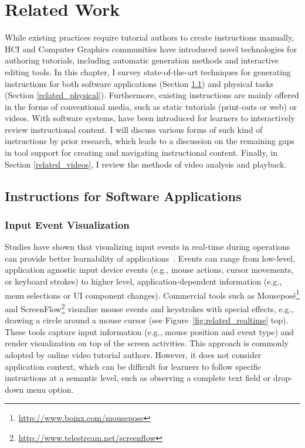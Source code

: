 
\chapter{Related Work}
\label{chapter_related_work}

While existing practices require tutorial authors to create instructions manually, HCI and Computer Graphics communities have introduced novel technologies for authoring tutorials, including automatic generation methods and interactive editing tools.
%
In this chapter, I survey state-of-the-art techniques for generating instructions for both software applications (Section \ref{related_software}) and physical tasks (Section \ref{related_physical}).
%
Furthermore, existing instructions are mainly offered in the forms of conventional media, such as static tutorials (print-outs or web) or videos. With software systems,  have been introduced for learners to interactively review instructional content. I will discuss various forms of such kind of instructions by prior research, which leads to a discussion on the remaining gaps in tool support for creating and navigating instructional content.
%
Finally, in Section \ref{related_videos}, I review the methods of video analysis and playback.


\section{Instructions for Software Applications}
\label{related_software}

\subsection{Input Event Visualization}

Studies have shown that visualizing input events in real-time during operations can provide better learnability of applications~\cite{Dixon:2010fb}. Events can range from low-level, application agnostic input device events (e.g., mouse actions, cursor movements, or keyboard strokes) to higher level, application-dependent information (e.g., menu selections or UI component changes).
%
Commercial tools such as Mouseposé\footnote{\url{http://www.boinx.com/mousepose}} and ScreenFlow\footnote{\url{http://www.telestream.net/screenflow}} visualize mouse events and keystrokes with special effects, e.g., drawing a circle around a mouse cursor (see Figure~\ref{fig:related_realtime} top). These tools capture input information (e.g., mouse position and event type) and render visualization on top of the screen activities. This approach is commonly adopted by online video tutorial authors. However, it does not consider application context, which can be difficult for learners to follow specific instructions at a semantic level, such as observing a complete text field or drop-down menu option.

